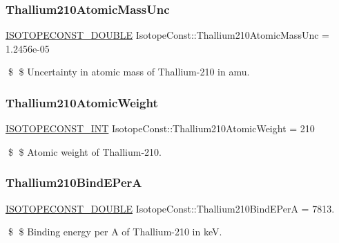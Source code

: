 \subsubsection{\texorpdfstring{Thallium210\+Atomic\+Mass\+Unc}{Thallium210AtomicMassUnc}}
{\footnotesize\ttfamily \mbox{\hyperlink{group___isotope_const-_macros_ga8f45a7272ce02c0b4c65c44636ed719a}{I\+S\+O\+T\+O\+P\+E\+C\+O\+N\+S\+T\+\_\+\+D\+O\+U\+B\+LE}} Isotope\+Const\+::\+Thallium210\+Atomic\+Mass\+Unc = 1.\+2456e-\/05}

\$ \$ Uncertainty in atomic mass of Thallium-\/210 in amu. \mbox{\label{group___isotope_const-_thallium-_tl210_gafd7a4af2fd06ba1ccf568a39a90049f4}} 
\subsubsection{\texorpdfstring{Thallium210\+Atomic\+Weight}{Thallium210AtomicWeight}}
{\footnotesize\ttfamily \mbox{\hyperlink{group___isotope_const-_macros_ga5f18360b3e99483a35c32d789e62621c}{I\+S\+O\+T\+O\+P\+E\+C\+O\+N\+S\+T\+\_\+\+I\+NT}} Isotope\+Const\+::\+Thallium210\+Atomic\+Weight = 210}

\$ \$ Atomic weight of Thallium-\/210. \mbox{\label{group___isotope_const-_thallium-_tl210_gaae7b3dcfa08a300f4751c2c939244541}} 
\subsubsection{\texorpdfstring{Thallium210\+Bind\+E\+PerA}{Thallium210BindEPerA}}
{\footnotesize\ttfamily \mbox{\hyperlink{group___isotope_const-_macros_ga8f45a7272ce02c0b4c65c44636ed719a}{I\+S\+O\+T\+O\+P\+E\+C\+O\+N\+S\+T\+\_\+\+D\+O\+U\+B\+LE}} Isotope\+Const\+::\+Thallium210\+Bind\+E\+PerA = 7813.}

\$ \$ Binding energy per A of Thallium-\/210 in keV. \mbox{\label{group___isotope_const-_thallium-_tl210_ga985f43552ac2b2d40f5115d66ea78cd6}} 
